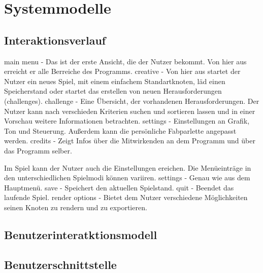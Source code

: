 \chapter{Systemmodelle}


\section{Interaktionsverlauf}
    main menu - Das ist der erste Ansicht, die der Nutzer bekommt. Von hier aus erreicht er alle Berreiche des Programms.
    creative - Von hier aus startet der Nutzer ein neues Spiel, mit einem einfachem Standartknoten, läd einen Speicherstand oder startet das erstellen von neuen Herausforderungen (challenges).
    challenge - Eine Übersicht, der vorhandenen Herausforderungen. Der Nutzer kann nach verschieden Kriterien suchen und sortieren lassen und in einer Vorschau weitere Informationen betrachten.
    settings - Einstellungen an Grafik, Ton und Steuerung. Außerdem kann die persönliche Fabparlette angepasst werden.
    credits - Zeigt Infos über die Mitwirkenden an dem Programm und über das Programm selber.
	\begin{figure}[htbp]
	  \centering
	  
	\end{figure}
	Im Spiel kann der Nutzer auch die Einstellungen ereichen. Die Menüeinträge in den unterschiedlichen Spielmodi können variiren.
	settings - Genau wie aus dem Hauptmenü.
	save - Speichert den aktuellen Spielstand.
	quit - Beendet das laufende Spiel.
	render options - Bietet dem Nutzer verschiedene Möglichkeiten seinen Knoten zu rendern und zu exportieren.
    \begin{figure}[htbp]
	  \centering
	  
	\end{figure}


\section{Benutzerinteratktionsmodell}

	\begin{figure}[htbp]
	  \centering
	  
	\end{figure}


\section{Benutzerschnittstelle}

	\begin{figure}[htbp]
	  \centering
	  
	\end{figure}

	\begin{figure}[htbp]
	  \centering
	  
	\end{figure}
